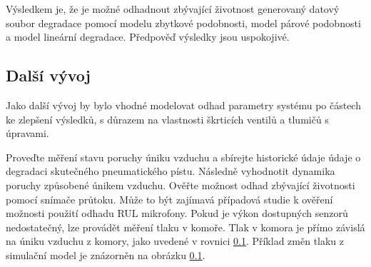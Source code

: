 Výsledkem je, že je možné odhadnout zbývající životnost
generovaný datový soubor degradace pomocí modelu zbytkové podobnosti,
model párové podobnosti a model lineární degradace. Předpověď
výsledky jsou uspokojivé.

\subsection{Další vývoj}

Jako další vývoj by bylo vhodné modelovat odhad
parametry systému po částech ke zlepšení výsledků, s důrazem na
vlastnosti škrticích ventilů a tlumičů s úpravami.

Proveďte měření stavu poruchy úniku vzduchu a sbírejte historické údaje
údaje o degradaci skutečného pneumatického pístu. Následně vyhodnotit
dynamika poruchy způsobené únikem vzduchu. Ověřte možnost
odhad zbývající životnosti pomocí snímače průtoku. Může to být
zajímavá případová studie k ověření možnosti použití odhadu RUL
mikrofony. Pokud je výkon dostupných senzorů nedostatečný,
lze provádět měření tlaku v komoře. Tlak v
komora je přímo závislá na úniku vzduchu z komory, jako
uvedené v rovnici \ref{}. Příklad změn tlaku z
simulační model je znázorněn na obrázku \ref{}.
